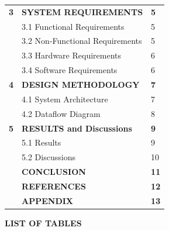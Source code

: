 \documentclass[12pt,a4paper]{article}
\begin{document}
\begin{center}
\begin{tabular}{p{3.8cm} p{7.5cm} p{2.5cm}}
\centering \textbf{3} & \textbf{SYSTEM REQUIREMENTS} & \hspace{0.8cm} \textbf{5} \\[1mm]
& 3.1 Functional Requirements & \hspace{0.8cm} 5 \\[1mm]
& 3.2 Non-Functional Requirements & \hspace{0.8cm} 5 \\[1mm]
& 3.3 Hardware Requirements & \hspace{0.8cm} 6 \\[1mm]
& 3.4 Software Requirements & \hspace{0.8cm} 6 \\[1mm]

\centering \textbf{4} & \textbf{DESIGN METHODOLOGY} & \hspace{0.8cm} \textbf{7} \\[1mm]
& 4.1 System Architecture & \hspace{0.8cm} 7 \\[1mm]
& 4.2 Dataflow Diagram & \hspace{0.8cm} 8 \\[1mm]

\centering \textbf{5} & \textbf{RESULTS and Discussions} & \hspace{0.8cm} \textbf{9} \\[1mm]
& 5.1 Results & \hspace{0.8cm} 9 \\[1mm]
& 5.2 Discussions & \hspace{0.8cm} 10 \\[1mm]

& \MakeUppercase{\textbf{Conclusion}} & \hspace{0.8cm} \textbf{11} \\[1mm]
& \MakeUppercase{\textbf{References}} & \hspace{0.8cm} \textbf{12} \\[1mm]
& \MakeUppercase{\textbf{Appendix}} & \hspace{0.8cm} \textbf{13} \\[1mm]

\end{tabular}

\end{center}
\newpage
\begin{center}
{\Large \textbf{LIST OF TABLES}}\\[1cm]
\end{center}
\end{document}

